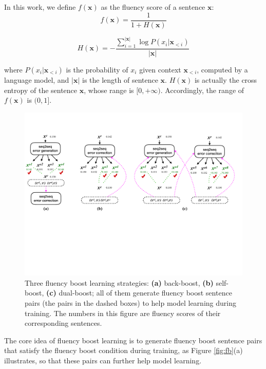 \documentclass{article} %
\begin{document}
In this work, we define $f(\boldsymbol{x})$ as the fluency score of a sentence $\boldsymbol{x}$:
\vspace{-0.05cm}
\begin{equation}\label{eq:fluency}
f(\boldsymbol{x})=\frac{1}{1+H(\boldsymbol{x})}
\end{equation}

\begin{equation}
H(\boldsymbol{x})=-\frac{\sum_{i=1}^{|\boldsymbol{x}|}\log P(x_i|\boldsymbol{x}_{<i})}{|\boldsymbol{x}|}
\end{equation}

\noindent where $P(x_i|\boldsymbol{x}_{<i})$ is the probability of $x_i$ given context $\boldsymbol{x}_{<i}$, computed by a language model, and $|\boldsymbol{x}|$ is the length of sentence $\boldsymbol{x}$. $H(\boldsymbol{x})$ is actually the cross entropy of the sentence $\boldsymbol{x}$, whose range is $[0,+\infty)$. Accordingly, the range of $f(\boldsymbol{x})$ is $(0,1]$.

\begin{figure}[t]
\centering
\includegraphics[width=13cm]{figures/back-self-dual.pdf}\vspace{-0.4cm}
\caption{Three fluency boost learning strategies: \textbf{(a)} back-boost, \textbf{(b)} self-boost, \textbf{(c)} dual-boost; all of them generate fluency boost sentence pairs (the pairs in the dashed boxes) to help model learning during training. The numbers in this figure are fluency scores of their corresponding sentences.}\label{fig:fbl}
\end{figure}

The core idea of fluency boost learning is to generate fluency boost sentence pairs that satisfy the fluency boost condition during training, as Figure \ref{fig:fb}(a) illustrates, so that these pairs can further help model learning.
\end{document}
